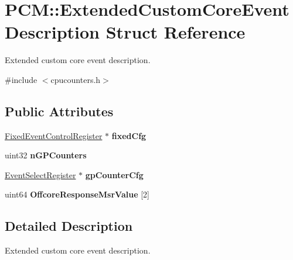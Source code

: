\hypertarget{struct_p_c_m_1_1_extended_custom_core_event_description}{}\section{P\+CM\+:\+:Extended\+Custom\+Core\+Event\+Description Struct Reference}
\label{struct_p_c_m_1_1_extended_custom_core_event_description}


Extended custom core event description.  




{\ttfamily \#include $<$cpucounters.\+h$>$}

\subsection*{Public Attributes}
\begin{DoxyCompactItemize}
\item 
\mbox{\label{struct_p_c_m_1_1_extended_custom_core_event_description_a793e3dbd33a6bc37f800bb990777a543}} 
\mbox{\hyperlink{struct_fixed_event_control_register}{Fixed\+Event\+Control\+Register}} $\ast$ {\bfseries fixed\+Cfg}
\item 
\mbox{\label{struct_p_c_m_1_1_extended_custom_core_event_description_ae66c1ea4e0b4ef493ee7d8c1f3245945}} 
uint32 {\bfseries n\+G\+P\+Counters}
\item 
\mbox{\label{struct_p_c_m_1_1_extended_custom_core_event_description_aa8f24e6871fe123345fd0141828374a1}} 
\mbox{\hyperlink{struct_event_select_register}{Event\+Select\+Register}} $\ast$ {\bfseries gp\+Counter\+Cfg}
\item 
\mbox{\label{struct_p_c_m_1_1_extended_custom_core_event_description_a2a1a8771723138bddbeae034c7710934}} 
uint64 {\bfseries Offcore\+Response\+Msr\+Value} \mbox{[}2\mbox{]}
\end{DoxyCompactItemize}


\subsection{Detailed Description}
Extended custom core event description. 

